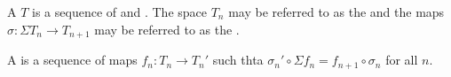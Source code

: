 \begin{definition} \label{definition:prespectrum_of_pointed_topological_spaces}
    A  $T$ is a sequence of   and  . The space $T_n$ may be referred to as the  and the maps $\sigma: \Sigma T_n \to T_{n+1}$ may be referred to as the . 
    
    A  is a sequence of maps $f_n: T_n \to T_n'$ such thta $\sigma_n' \circ \Sigma f_n = f_{n+1} \circ \sigma_n$ for all $n$.
\end{definition}
